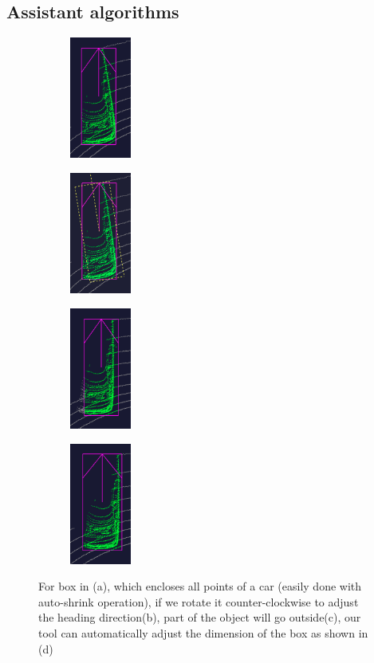 \documentclass[letterpaper, 10 pt, conference]{ieeeconf}  %
\begin{document}
\subsection{Assistant algorithms}
\begin{figure}[t]
	\centering

	\begin{subfigure}[t]{0.2\linewidth}
		\includegraphics[height=4cm]{./figures/points-enclosed}
		\caption{}

	\end{subfigure}\hfill
	\begin{subfigure}[t]{0.2\linewidth}
		\includegraphics[height=4cm]{./figures/adjust-naively}
		\caption{}
		\label{fig:box-rotate-in-subview}
	\end{subfigure}\hfill
	\begin{subfigure}[t]{0.2\linewidth}
		\includegraphics[height=4cm]{./figures/rotate-fail}
		\caption{}
	\end{subfigure}\hfill
	\begin{subfigure}[t]{0.2\linewidth}
		\includegraphics[height=4cm]{./figures/rotate-success}
		\caption{}
	\end{subfigure}\hfill
	\caption{For box in (a), which encloses all points of a car (easily done with auto-shrink operation), if we rotate it counter-clockwise to adjust the heading direction(b), part of the object will go outside(c), our tool can automatically adjust the dimension of the box as shown in (d)}
	\label{fig:boundary-aware-rotation}
\vspace{-0.3cm}
\end{figure}
\end{document}
